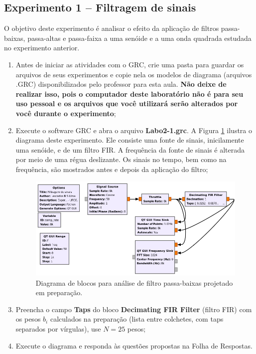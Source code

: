 \documentclass[12pt,addpoints]{exam}
\newcommand{\myscale}{0.4}
\begin{document}
\subsection{Experimento 1 -- Filtragem de sinais}

O objetivo deste experimento é analisar o efeito da aplicação de filtros passa-baixas, passa-altas e passa-faixa a uma senóide e a uma onda quadrada estudada no experimento anterior.

  \begin{enumerate}
    \item Antes de iniciar as atividades com o GRC, crie uma pasta para guardar os arquivos de seus experimentos e copie nela os modelos de diagrama (arquivos .GRC) disponibilizados pelo professor para esta aula. \textbf{Não deixe de realizar isso, pois o computador deste laboratório não é para seu uso pessoal e os arquivos que você utilizará serão alterados por você durante o experimento};
    \item Execute o software GRC e abra o arquivo \textbf{Labo2-1.grc}. A Figura \ref{fig:GRC_2-1} ilustra o diagrama deste experimento. Ele consiste uma fonte de sinais, inicilamente uma senóide, e de um filtro FIR. A frequência da fonte de sinais é alterada por meio de uma régua deslizante. Os sinais no tempo, bem como na frequência, são mostrados antes e depois da aplicação do filtro;
    \begin{figure}[htb]
        \centering
        \includegraphics[scale=\myscale]{./Figuras/GRC_2-1a}
        \caption{Diagrama de blocos para análise de filtro passa-baixas projetado em preparação.} 
        \label{fig:GRC_2-1}
    \end{figure}
    \item Preencha o campo \textbf{Taps} do bloco \textbf{Decimating FIR Filter} (filtro FIR) com os pesos $b_i$ calculados na preparação (lista entre colchetes, com taps separados por vírgulas), use $N=25$ pesos;
    \item Execute o diagrama e responda às questões propostas na Folha de Respostas.
\end{enumerate}
\end{document}
